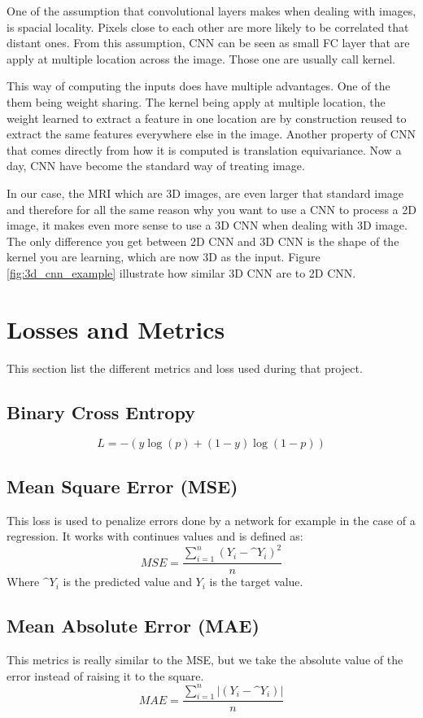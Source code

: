 One of the assumption that convolutional layers makes when dealing with images, is spacial locality. Pixels close to each other are more likely to be correlated that distant ones. From this assumption, CNN can be seen as small FC layer that are apply at multiple location across the image. Those one are usually call kernel. 

This way of computing the inputs does have multiple advantages. One of the them being weight sharing. The kernel being apply at multiple location, the weight learned to extract a feature in one location are by construction reused to extract the same features everywhere else in the image. Another property of CNN that comes directly from how it is computed is translation equivariance. Now a day, CNN have become the standard way of treating image.

In our case, the MRI which are 3D images, are even larger that standard image and therefore for all the same reason why you want to use a CNN to process a 2D image, it makes even more sense to use a 3D CNN when dealing with 3D image. The only difference you get between 2D CNN and 3D CNN is the shape of the kernel you are learning, which are now 3D as the input. Figure \ref{fig:3d_cnn_example} illustrate how similar 3D CNN are to 2D CNN.



\section{Losses and Metrics}
\label{sec:losses_metrics}
This section list the different metrics and loss used during that project.

\subsection{Binary Cross Entropy}
\label{sec:binary_cross_entropy}

$$ L = -(y\log(p) + (1-y)\log(1-p))$$

\subsection{Mean Square Error (MSE)}
\label{sec:mean_square_error}
This loss is used to penalize errors done by a network for example in the case of a regression. It works with continues values and is defined as:
$$ MSE = \frac{\sum_{i=1}^{n} (Y_i - \^{Y}_i)^2}{n}$$
Where $\^{Y}_i$ is the predicted value and $Y_i$ is the target value.
\subsection{Mean Absolute Error (MAE)}
This metrics is really similar to the MSE, but we take the absolute value of the error instead of raising it to the square.
$$ MAE = \frac{\sum_{i=1}^{n} |(Y_i - \^{Y}_i)|}{n}$$
